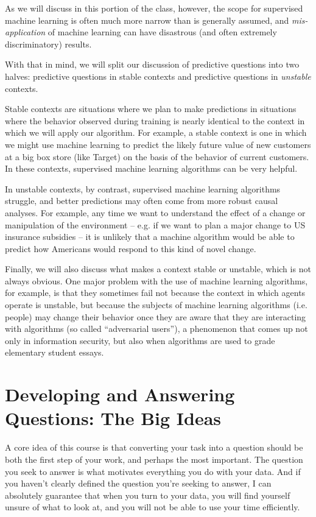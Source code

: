 \documentclass[12pt]{article}
\begin{document}
As we will discuss in this portion of the class, however, the scope for supervised machine learning is often much more narrow than is generally assumed, and \emph{mis-application} of machine learning can have disastrous (and often extremely discriminatory) results.

With that in mind, we will split our discussion of predictive questions into two halves: predictive questions in stable contexts and predictive questions in \emph{unstable} contexts.

Stable contexts are situations where we plan to make predictions in situations where the behavior observed during training is nearly identical to the context in which we will apply our algorithm. For example, a stable context is one in which we might use machine learning to predict the likely future value of new customers at a big box store (like Target) on the basis of the behavior of current customers. In these contexts, supervised machine learning algorithms can be very helpful.

In unstable contexts, by contrast, supervised machine learning algorithms struggle, and better predictions may often come from more robust causal analyses. For example, any time we want to understand the effect of a change or manipulation of the environment -- e.g. if we want to plan a major change to US insurance subsidies -- it is unlikely that a machine algorithm would be able to predict how Americans would respond to this kind of novel change.

Finally, we will also discuss what makes a context stable or unstable, which is not always obvious. One major problem with the use of machine learning algorithms, for example, is that they sometimes fail not because the context in which agents operate is unstable, but because the subjects of machine learning algorithms (i.e. people) may change their behavior once they are aware that they are interacting with algorithms (so called ``adversarial users''), a phenomenon that comes up not only in information security, but also when algorithms are used to grade elementary student essays.

\section{Developing and Answering Questions: The Big Ideas}

A core idea of this course is that converting your task into a question should be both the first step of your work, and perhaps the most important. The question you seek to answer is what motivates everything you do with your data. And if you haven't clearly defined the question you're seeking to answer, I can absolutely guarantee that when you turn to your data, you will find yourself unsure of what to look at, and you will not be able to use your time efficiently.
\end{document}
